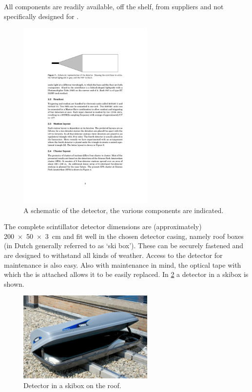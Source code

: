 All components are readily available, off the shelf, from suppliers and not specifically designed for \hisparc.

\begin{figure}
    \centering
    \includegraphics[width=0.6\textwidth]
                    {plots/station/schematic_detector}
    \caption{A schematic of the detector, the various components are indicated.}
    \label{fig:schematic_detector}
\end{figure}

The complete scintillator detector dimensions are (approximately) \SI[product-units=power]{200 x 50 x 3}{\centi\meter} and fit well in the chosen detector casing, namely roof boxes (in Dutch generally referred to as `ski box'). These can be securely fastened and are designed to withstand all kinds of weather. Access to the detector for maintenance is also easy. Also with maintenance in mind, the optical tape with which the \pmt is attached allows it to be easily replaced. In \cref{fig:detector_in_skibox} a detector in a skibox is shown.

\begin{figure}
    \centering
    \includegraphics[width=0.6\textwidth]
                    {plots/station/ADL_105036.jpg}
    \caption{Detector in a skibox on the roof.}
    \label{fig:detector_in_skibox}
\end{figure}


